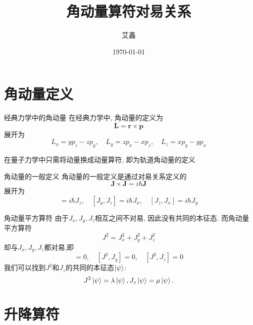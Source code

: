 \documentclass{beamer}
\title{角动量算符对易关系}
\author{艾鑫}
\institute[三峡大学]{三峡大学\hspace{1em}理学院}
\date{\today}
\begin{document}
\maketitle

\section{角动量定义}

\begin{frame}{经典力学中的角动量}
在经典力学中, 角动量的定义为
\begin{equation}
\bm{L} = \bm{r} \times \bm{p}
\end{equation}
展开为
\begin{equation}
L_x = yp_z - zp_y, \quad L_y = zp_x - xp_z, \quad L_z = xp_y - yp_x
\end{equation}

在量子力学中只需将动量换成动量算符, 即为轨道角动量的定义
\end{frame}

\begin{frame}{角动量的一般定义}
角动量的一般定义是通过对易关系定义的
\begin{equation}
\bm{J} \times \bm{J} = i \hbar \bm{J}
\end{equation}
展开为
\begin{equation}
[J_x, J_y] = i\hbar J_z , \quad [J_y, J_z] = i \hbar J_x , \quad [J_z, J_x] = i\hbar J_y
\end{equation}
\end{frame}

\begin{frame}{角动量平方算符}
由于$J_x, J_y, J_z$相互之间不对易, 因此没有共同的本征态. 而角动量平方算符
\begin{equation}
J^2 = J_x^2 + J_y^2 + J_z^2
\end{equation}
却与$J_x, J_y, J_z$都对易,即
\begin{equation}
[J^2,J_x] = 0, \quad [J^2, J_y] = 0, \quad [J^2, J_z] = 0
\end{equation}
我们可以找到$J^2$和$J_z$的共同的本征态$\ket{\psi}$:
\begin{equation}
J^2 \ket{\psi} = \lambda \ket{\psi}, J_z \ket{\psi} = \mu \ket{\psi}.
\end{equation}
\end{frame}

\section{升降算符}
\end{document}
